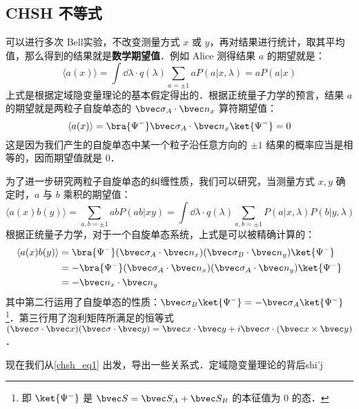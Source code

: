 \subsection{CHSH 不等式}
可以进行多次 Bell实验，不改变测量方式 $x$ 或 $y$，再对结果进行统计，取其平均值，那么得到的结果就是\textbf{数学期望值}．例如 Alice 测得结果 $a$ 的期望就是：
\begin{equation}
\langle a(x) \rangle =\int \dd \lambda \cdot q(\lambda) \sum_{a=\pm 1}a P(a|x,\lambda) = a P(a|x)
\end{equation}
上式是根据定域隐变量理论的基本假定得出的．根据正统量子力学的预言，结果 $a$ 的期望就是两粒子自旋单态的 $\bvec \sigma_A\cdot \bvec n_x$ 算符期望值：
\begin{equation}
\langle a(x)\rangle = \bra{\Psi^-} \bvec \sigma_A \cdot \bvec n_x \ket{\Psi^-} = 0
\end{equation}
这是因为我们产生的自旋单态中某一个粒子沿任意方向的 $\pm 1$ 结果的概率应当是相等的，因而期望值就是 $0$．

为了进一步研究两粒子自旋单态的纠缠性质，我们可以研究，当测量方式 $x,y$ 确定时，$a$ 与 $b$ 乘积的期望值：
\begin{equation}\label{chsh_eq1}
\langle a(x)b(y)\rangle = \sum_{a,b=\pm 1} ab P(ab|xy)=\int \dd\lambda \cdot q(\lambda) \sum_{a,b=\pm 1}P(a|x,\lambda)P(b|y,\lambda)
\end{equation}
根据正统量子力学，对于一个自旋单态系统，上式是可以被精确计算的：
\begin{equation}
\begin{aligned}
\langle a(x)b(y)\rangle &= \bra{\Psi^-} (\bvec \sigma_A\cdot \bvec n_x)(\bvec \sigma_B\cdot \bvec n_y)\ket{\Psi^-}\\
&=-\bra{\Psi^-} (\bvec \sigma_A\cdot \bvec n_x)(\bvec \sigma_A\cdot \bvec n_y)\ket{\Psi^-}\\
&=-\bvec n_x\cdot \bvec n_y
\end{aligned}
\end{equation}
其中第二行运用了自旋单态的性质：$\bvec \sigma_B\ket{\Psi^-}=-\bvec \sigma_A\ket{\Psi^-}$ \footnote{即 $\ket{\Psi^-}$  是 $\bvec S=\bvec S_A+\bvec S_B$ 的本征值为 $0$ 的态．}．第三行用了泡利矩阵所满足的恒等式 $(\bvec \sigma \cdot \bvec x)(\bvec \sigma\cdot \bvec y)=\bvec x\cdot \bvec y+i\bvec \sigma\cdot (\bvec x\times \bvec y)$．

现在我们从\autoref{chsh_eq1} 出发，导出一些关系式．定域隐变量理论的背后shi'j